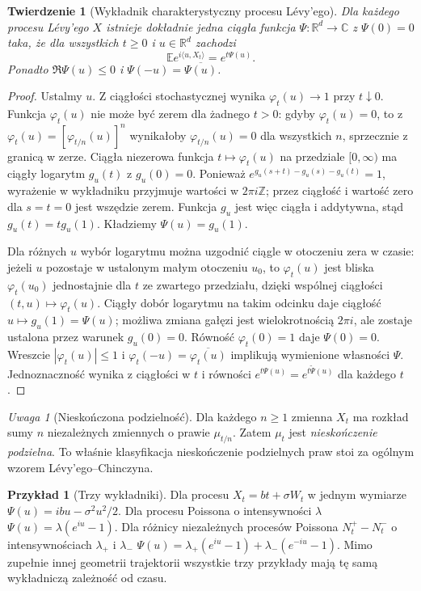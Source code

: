 \documentclass[11pt,a4paper,oneside]{report}
\numberwithin{equation}{chapter}
\theoremstyle{plain}
\newtheorem{twierdzenie}{Twierdzenie}[chapter]
\theoremstyle{definition}
\newtheorem{przyklad}{Przykład}[chapter]
\theoremstyle{remark}
\newtheorem{uwaga}{Uwaga}[chapter]
\newcommand{\R}{\mathbb{R}}
\newcommand{\Z}{\mathbb{Z}}
\newcommand{\E}{\mathbb{E}}
\begin{document}
\begin{twierdzenie}[Wykładnik charakterystyczny procesu Lévy'ego]
\label{th:levy-exponent}
Dla każdego procesu Lévy'ego $X$ istnieje dokładnie jedna
ciągła funkcja $\Psi:\R^d\to\mathbb C$ z $\Psi(0)=0$
taka, że dla wszystkich $t\ge0$ i $u\in\R^d$ zachodzi
\[
\E e^{i\langle u,X_t\rangle}=e^{t\Psi(u)}.
\tag{10.1}\label{eq:levy-exponent}
\]
Ponadto $\Re\Psi(u)\le0$ i $\Psi(-u)=\overline{\Psi(u)}$.
\end{twierdzenie}
\begin{proof}
Ustalmy $u$. Z ciągłości stochastycznej wynika
$\varphi_t(u)\to1$ przy $t\downarrow0$.
Funkcja $\varphi_t(u)$ nie może być zerem dla żadnego $t>0$:
gdyby $\varphi_t(u)=0$, to z
$\varphi_t(u)=[\varphi_{t/n}(u)]^n$ wynikałoby
$\varphi_{t/n}(u)=0$ dla wszystkich $n$, sprzecznie z
granicą w zerze. Ciągła niezerowa funkcja
$t\mapsto\varphi_t(u)$ na przedziale $[0,\infty)$
ma ciągły logarytm $g_u(t)$ z $g_u(0)=0$.
Ponieważ $e^{g_u(s+t)-g_u(s)-g_u(t)}=1$,
wyrażenie w wykładniku przyjmuje wartości w $2\pi i\Z$;
przez ciągłość i wartość zero dla $s=t=0$ jest wszędzie zerem.
Funkcja $g_u$ jest więc ciągła i addytywna, stąd
$g_u(t)=t g_u(1)$. Kładziemy $\Psi(u)=g_u(1)$.

Dla różnych $u$ wybór logarytmu można uzgodnić ciągle
w otoczeniu zera w czasie: jeżeli $u$ pozostaje w ustalonym
małym otoczeniu $u_0$, to $\varphi_t(u)$ jest bliska
$\varphi_t(u_0)$ jednostajnie dla $t$ ze zwartego przedziału,
dzięki wspólnej ciągłości $(t,u)\mapsto\varphi_t(u)$.
Ciągły dobór logarytmu na takim odcinku daje ciągłość
$u\mapsto g_u(1)=\Psi(u)$; możliwa zmiana gałęzi jest
wielokrotnością $2\pi i$, ale zostaje ustalona przez
warunek $g_u(0)=0$. Równość $\varphi_t(0)=1$ daje
$\Psi(0)=0$. Wreszcie $|\varphi_t(u)|\le1$ i
$\varphi_t(-u)=\overline{\varphi_t(u)}$ implikują
wymienione własności $\Psi$.
Jednoznaczność wynika z ciągłości w $t$ i równości
$e^{t\Psi(u)}=e^{t\widetilde\Psi(u)}$ dla każdego $t$.
\end{proof}

\begin{uwaga}[Nieskończona podzielność]
Dla każdego $n\ge1$ zmienna $X_t$ ma rozkład sumy $n$
niezależnych zmiennych o prawie $\mu_{t/n}$.
Zatem $\mu_t$ jest \emph{nieskończenie podzielna}.
To właśnie klasyfikacja nieskończenie podzielnych praw
stoi za ogólnym wzorem Lévy'ego--Chinczyna.
\end{uwaga}

\begin{przyklad}[Trzy wykładniki]
Dla procesu $X_t=bt+\sigma W_t$ w jednym wymiarze
$\Psi(u)=ibu-\sigma^2u^2/2$.
Dla procesu Poissona o intensywności $\lambda$
$\Psi(u)=\lambda(e^{iu}-1)$.
Dla różnicy niezależnych procesów Poissona
$N_t^+-N_t^-$ o intensywnościach $\lambda_+$ i $\lambda_-$
$\Psi(u)=\lambda_+(e^{iu}-1)+\lambda_-(e^{-iu}-1)$.
Mimo zupełnie innej geometrii trajektorii wszystkie trzy
przykłady mają tę samą wykładniczą zależność od czasu.
\end{przyklad}
\end{document}
